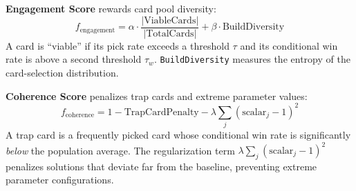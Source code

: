 \textbf{Engagement Score} rewards card pool diversity:
\begin{equation}
f_{\text{engagement}} = \alpha \cdot \frac{|\text{ViableCards}|}{|\text{TotalCards}|} + \beta \cdot \text{BuildDiversity}
\label{eq:engagement_score}
\end{equation}
A card is ``viable'' if its pick rate exceeds a threshold $\tau$ and its conditional win rate is above a second threshold $\tau_w$. \texttt{BuildDiversity} measures the entropy of the card-selection distribution.

\textbf{Coherence Score} penalizes trap cards and extreme parameter values:
\begin{equation}
f_{\text{coherence}} = 1 - \text{TrapCardPenalty} - \lambda \sum_{j}\left(\text{scalar}_j - 1\right)^2
\label{eq:coherence_score}
\end{equation}
A trap card is a frequently picked card whose conditional win rate is significantly \textit{below} the population average. The regularization term $\lambda \sum_j (\text{scalar}_j - 1)^2$ penalizes solutions that deviate far from the baseline, preventing extreme parameter configurations.
